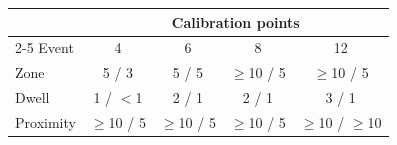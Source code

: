 \begin{tabular}{lcccc}
\toprule
 & \multicolumn{4}{c}{Calibration points} \\
\cmidrule(lr){2-5}
Event & 4 & 6 & 8 & 12 \\
\midrule
Zone & 5 / 3 & 5 / 5 & $\geq$10 / 5 & $\geq$10 / 5 \\
Dwell & 1 / $<$1 & 2 / 1 & 2 / 1 & 3 / 1 \\
Proximity & $\geq$10 / 5 & $\geq$10 / 5 & $\geq$10 / 5 & $\geq$10 / $\geq$10 \\
\bottomrule
\end{tabular}
